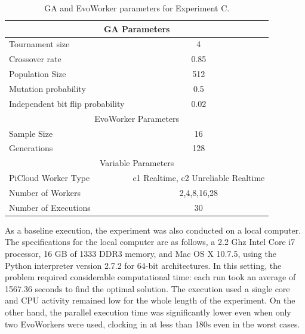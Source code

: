 \begin{table}[t]
\renewcommand{\arraystretch}{1.3}
\caption{GA and EvoWorker parameters for Experiment C.}
\label{tab:paramse}
\centering
\begin{tabular}{|l||c|}
\hline
\multicolumn{2}{|c|}{GA Parameters} \\
\hline
Tournament size & 4 \\
Crossover rate & 0.85  \\
Population Size & 512 \\
Mutation probability & 0.5 \\
Independent bit flip probability  & 0.02 \\
\hline
\multicolumn{2}{|c|}{EvoWorker Parameters} \\
\hline
Sample Size & 16 \\
Generations & 128 \\
\hline
\multicolumn{2}{|c|}{Variable Parameters} \\
\hline
PiCloud Worker Type & c1 Realtime, c2 Unreliable Realtime \\
Number of Workers & 2,4,8,16,28 \\
Number of Executions & 30 \\
\hline

\end{tabular}
\end{table}

As a baseline execution, the experiment was also conducted on a local computer. The specifications for the local computer are as follows, a
2.2 Ghz Intel Core i7 processor, 16 GB of 1333 DDR3 memory, and Mac OS X 10.7.5,
using the Python interpreter version 2.7.2 for 64-bit architectures. 
In this setting, the problem required considerable computational time: each run took an average of 1567.36 seconds to find the optimal solution.
The execution used a single core and CPU activity remained low for the whole length of the experiment. On the other hand,
the parallel execution time was significantly lower even when only two EvoWorkers were used, clocking in at less than 180s even in the worst cases.


